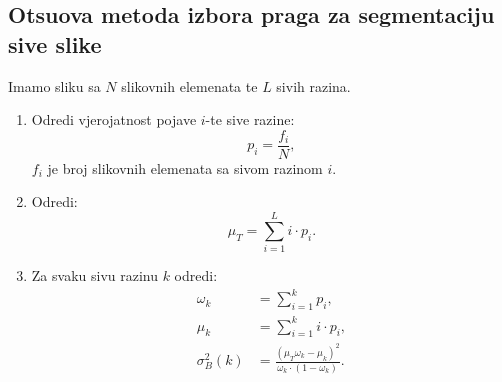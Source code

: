 \documentclass[11pt,english]{article}
\begin{document}
\subsection{Otsuova metoda izbora praga za segmentaciju sive slike}
Imamo sliku sa $N$ slikovnih elemenata te $L$ sivih razina.
\begin{enumerate}
	\item Odredi vjerojatnost pojave $i$-te sive razine:
	$$p_i = \frac{f_i}{N},$$
	$f_i$ je broj slikovnih elemenata sa sivom razinom $i$.
  \item Odredi:
  $$\mu_T=\sum_{i=1}^L i\cdot p_i.$$
  \item Za svaku sivu razinu $k$ odredi:
  \begin{align*}
    \omega_k &= \sum_{i=1}^k p_i,\\
    \mu_k &= \sum_{i=1}^k i\cdot p_i,\\
    \sigma_B^2(k) &= \frac{\left( \mu_T\omega_k-\mu_k\right)^2}{\omega_k\cdot\left(1-\omega_k\right)}.
  \end{align*}

\end{enumerate}
\end{document}
